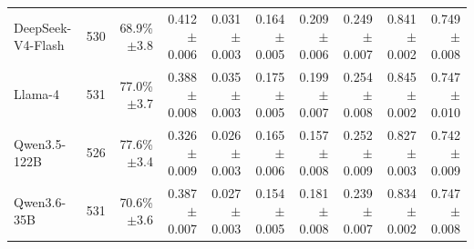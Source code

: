 \begin{table}[t]
\begin{tabular*}{\textwidth}{@{\extracolsep{\fill}}lrrrrrrrrr@{}}
DeepSeek-V4-Flash & 530 & \shortstack[r]{68.9\%\\{\scriptsize $\pm$3.8}} & \shortstack[r]{0.412\\{\scriptsize $\pm$0.006}} & \shortstack[r]{0.031\\{\scriptsize $\pm$0.003}} & \shortstack[r]{0.164\\{\scriptsize $\pm$0.005}} & \shortstack[r]{0.209\\{\scriptsize $\pm$0.006}} & \shortstack[r]{0.249\\{\scriptsize $\pm$0.007}} & \shortstack[r]{0.841\\{\scriptsize $\pm$0.002}} & \shortstack[r]{0.749\\{\scriptsize $\pm$0.008}} \\
Llama-4 & 531 & \shortstack[r]{77.0\%\\{\scriptsize $\pm$3.7}} & \shortstack[r]{0.388\\{\scriptsize $\pm$0.008}} & \shortstack[r]{0.035\\{\scriptsize $\pm$0.003}} & \shortstack[r]{0.175\\{\scriptsize $\pm$0.005}} & \shortstack[r]{0.199\\{\scriptsize $\pm$0.007}} & \shortstack[r]{0.254\\{\scriptsize $\pm$0.008}} & \shortstack[r]{0.845\\{\scriptsize $\pm$0.002}} & \shortstack[r]{0.747\\{\scriptsize $\pm$0.010}} \\
Qwen3.5-122B & 526 & \shortstack[r]{77.6\%\\{\scriptsize $\pm$3.4}} & \shortstack[r]{0.326\\{\scriptsize $\pm$0.009}} & \shortstack[r]{0.026\\{\scriptsize $\pm$0.003}} & \shortstack[r]{0.165\\{\scriptsize $\pm$0.006}} & \shortstack[r]{0.157\\{\scriptsize $\pm$0.008}} & \shortstack[r]{0.252\\{\scriptsize $\pm$0.009}} & \shortstack[r]{0.827\\{\scriptsize $\pm$0.003}} & \shortstack[r]{0.742\\{\scriptsize $\pm$0.009}} \\
Qwen3.6-35B & 531 & \shortstack[r]{70.6\%\\{\scriptsize $\pm$3.6}} & \shortstack[r]{0.387\\{\scriptsize $\pm$0.007}} & \shortstack[r]{0.027\\{\scriptsize $\pm$0.003}} & \shortstack[r]{0.154\\{\scriptsize $\pm$0.005}} & \shortstack[r]{0.181\\{\scriptsize $\pm$0.008}} & \shortstack[r]{0.239\\{\scriptsize $\pm$0.007}} & \shortstack[r]{0.834\\{\scriptsize $\pm$0.002}} & \shortstack[r]{0.747\\{\scriptsize $\pm$0.008}} \\

\end{tabular*}
\end{table}
